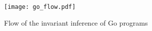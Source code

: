 



\begin{figure}
  \texttt{[image: go\_flow.pdf]}
  \caption{Flow of the invariant inference of Go programs}
  \label{fig:go_flow}
\end{figure}